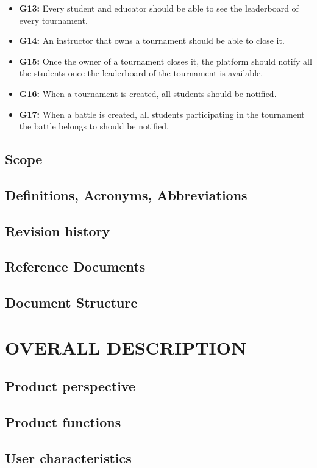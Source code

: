 \documentclass{article}
\begin{document}
\begin{itemize}
    \item \textbf{G13:} Every student and educator should be able to see the leaderboard of every tournament.
    \item \textbf{G14:} An instructor that owns a tournament should be able to close it.
    \item \textbf{G15:} Once the owner of a tournament closes it, the platform should notify all the students once the leaderboard of the tournament is available.
    \item \textbf{G16:} When a tournament is created, all students should be notified. 
    \item \textbf{G17:} When a battle is created, all students participating in the tournament the battle belongs to should be notified.
\end{itemize}

\subsection{Scope}  


\subsection{Definitions, Acronyms, Abbreviations}
\subsection{Revision history}
\subsection{Reference Documents}
\subsection{Document Structure}

\section{OVERALL DESCRIPTION}
\subsection{Product perspective}
\subsection{Product functions}
\subsection{User characteristics}
\end{document}
